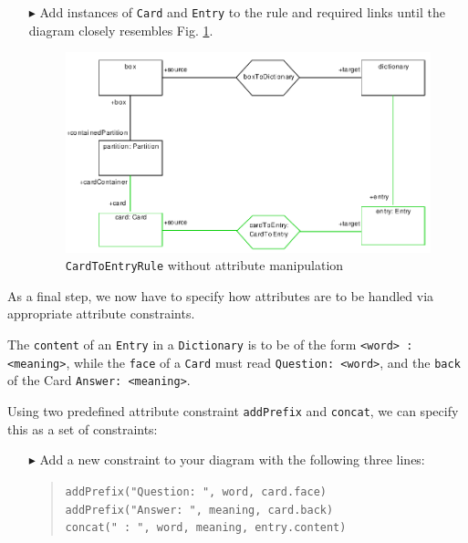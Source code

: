 \begin{enumerate}
  \item[$\blacktriangleright$] Add instances of \texttt{Card} and \texttt{Entry} to the rule and required links 
  until the diagram closely resembles Fig. \ref{fig:cardtoentry_1}.

  \begin{figure}[htbp]
  \begin{center}
    \includegraphics[width=\textwidth]{pics/tggBilder/tggRule/tgg19}
    \caption{\texttt{CardToEntryRule} without attribute manipulation}
    \label{fig:cardtoentry_1}
  \end{center}
  \end{figure}

\end{enumerate}


As a final step, we now have to specify how attributes are to be handled via appropriate attribute constraints.

The \texttt{content} of an \texttt{Entry} in a \texttt{Dictionary} is to be of the form \texttt{<word> : <meaning>}, while the \texttt{face} of a \texttt{Card} must read \texttt{Question: <word>}, and the \texttt{back} of the Card \texttt{Answer: <meaning>}.

Using two predefined attribute constraint \texttt{addPrefix} and \texttt{concat}, we can specify this as a set of constraints:

\begin{enumerate}
\item[$\blacktriangleright$] Add a new constraint to your diagram with the following three lines:
\begin{quotation}
\noindent \texttt{addPrefix("Question: ", word, card.face)}\\
\texttt{addPrefix("Answer: ", meaning, card.back)}\\
\texttt{concat("~:~", word, meaning, entry.content)}
\end{quotation}

\end{enumerate}

